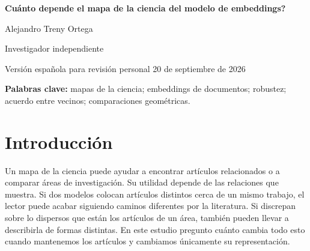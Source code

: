 \documentclass[12pt]{article}
\begin{document}
\begin{center}
{\LARGE\bfseries \textquestiondown{}Cuánto depende el mapa de la ciencia del modelo de embeddings?\par}
\vspace{12pt}
{\large Alejandro Treny Ortega\par}
\smallskip
Investigador independiente\par
\medskip
{\small Versión española para revisión personal \textbullet{} 20 de septiembre de 2026\par}
\end{center}

\begin{abstract}
Los mapas de la ciencia usan las relaciones entre artículos para describir cómo se organiza la investigación. Cuando esas relaciones proceden de embeddings de texto, un modelo convierte cada artículo en una lista de números. \textquestiondown{}Otro modelo daría la misma imagen? Comparo diez modelos con una misma colección de 500.000 registros de OpenAlex, de 26 áreas y del período 2000--2024. Examino la organización general, qué artículos quedan más cerca unos de otros y cómo se distribuyen dentro de cada área. Los modelos comparten una organización general, pero, al buscar dentro de la misma área y período, dos modelos conservan en promedio unos ocho de los mismos 25 artículos más cercanos. Usar solo el título, en lugar del título y el resumen, cambia esos vecinos casi tanto como cambiar el modelo. En una exploración posterior, los modelos también discrepan sobre cuál de dos áreas tiene representaciones más dispersas. Esas respuestas opuestas pueden repetirse al seleccionar otros artículos, aunque muchas diferencias son pequeñas y las decisiones de procesamiento importan. Repetir un resultado con otros artículos no garantiza, por tanto, que otro modelo lo respalde. Los resultados identifican dependencia de la representación; no establecen qué modelo describe mejor la investigación.
\end{abstract}
\textbf{Palabras clave:} mapas de la ciencia; embeddings de documentos; robustez; acuerdo entre vecinos; comparaciones geométricas.

\section{Introducción}
Un mapa de la ciencia puede ayudar a encontrar artículos relacionados o a comparar áreas de investigación. Su utilidad depende de las relaciones que muestra. Si dos modelos colocan artículos distintos cerca de un mismo trabajo, el lector puede acabar siguiendo caminos diferentes por la literatura. Si discrepan sobre lo dispersos que están los artículos de un área, también pueden llevar a describirla de formas distintas. En este estudio pregunto cuánto cambia todo esto cuando mantenemos los artículos y cambiamos únicamente su representación.
\end{document}
